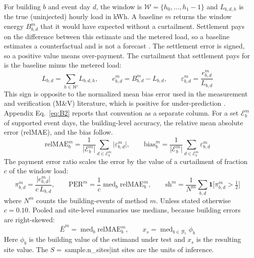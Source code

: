 For building $b$ and event day $d$, the window is $\mathcal{W}=\{h_0,\dots,h_1-1\}$ and $L_{b,d,h}$ is the true (uninjected) hourly load in kWh. A baseline $m$ returns the window energy $B^{m}_{b,d}$ that it would have expected without a curtailment. Settlement pays on the difference between this estimate and the metered load, so a baseline estimates a counterfactual and is not a forecast \cite{li2026review}. The settlement error is signed, so a positive value means over-payment. The curtailment that settlement pays for is the baseline minus the metered load:
\begin{equation}\label{eq:err}
L_{b,d}=\sum_{h\in\mathcal{W}}L_{b,d,h},\qquad e^{m}_{b,d}=B^{m}_{b,d}-L_{b,d},\qquad \varepsilon^{m}_{b,d}=\frac{e^{m}_{b,d}}{L_{b,d}}
\end{equation}
This sign is opposite to the normalized mean bias error used in the measurement and verification (M\&V) literature, which is positive for under-prediction \cite{granderson2021}. Appendix Eq.~\eqref{eq:B2} reports that convention as a separate column. For a set $\mathcal{E}^{m}_{b}$ of supported event days, the building-level accuracy, the relative mean absolute error (relMAE), and the bias follow.
\begin{equation}\label{eq:relmae}
\mathrm{relMAE}^{m}_{b}=\frac{1}{\lvert\mathcal{E}^{m}_{b}\rvert}\sum_{d\in\mathcal{E}^{m}_{b}}\lvert\varepsilon^{m}_{b,d}\rvert,\qquad \mathrm{bias}^{m}_{b}=\frac{1}{\lvert\mathcal{E}^{m}_{b}\rvert}\sum_{d\in\mathcal{E}^{m}_{b}}\varepsilon^{m}_{b,d}
\end{equation}
The payment error ratio scales the error by the value of a curtailment of fraction $c$ of the window load:
\begin{equation}\label{eq:per}
\pi^{m}_{b,d}=\frac{\lvert e^{m}_{b,d}\rvert}{c\,L_{b,d}},\qquad \mathrm{PER}^{m}=\frac{1}{c}\operatorname{med}_{b}\mathrm{relMAE}^{m}_{b},\qquad \mathrm{sh}^{m}=\frac{1}{N^{m}}\sum_{b,d}\mathbf{1}\bigl[\pi^{m}_{b,d}>\tfrac{1}{2}\bigr]
\end{equation}
where $N^{m}$ counts the building-events of method $m$. Unless stated otherwise $c=0.10$. Pooled and site-level summaries use medians, because building errors are right-skewed:
\begin{equation}\label{eq:site}
\bar{E}^{m}=\operatorname{med}_{b}\mathrm{relMAE}^{m}_{b},\qquad x_{s}=\operatorname{med}_{b\in\mathcal{B}_{s}}\phi_{b}
\end{equation}
Here $\phi_b$ is the building value of the estimand under test and $x_s$ is the resulting site value. The $S=\,${{sample.n_sites|int}} sites are the units of inference.

